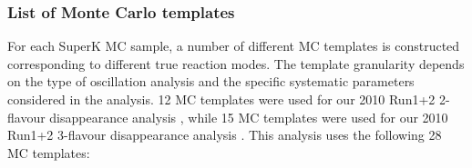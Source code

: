 \subsubsection {List of Monte Carlo templates}
\label{sec:mc_templates:template_list}

For each SuperK MC sample, a number of different MC templates is constructed 
corresponding to different true reaction modes.
The template granularity depends on the type of oscillation analysis and the specific 
systematic parameters considered in the analysis.
12 MC templates were used for our 2010 Run1+2 2-flavour disappearance analysis \cite{OurRun12DisappAnalysis}, while
15 MC templates were used for our 2010 Run1+2 3-flavour disappearance analysis \cite{OurRun12DisappAnalysis3Flavour}.
This analysis uses the following 28 MC templates:

